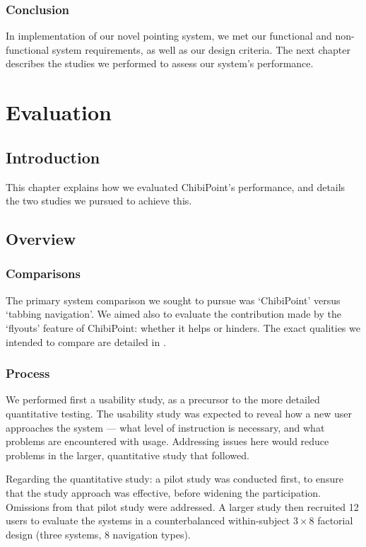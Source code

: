 \documentclass[11pt,openright,a4paper]{report}
\begin{document}
\subsection{Conclusion}
In implementation of our novel pointing system, we met our functional and non-functional system requirements, as well as our design criteria. The next chapter describes the studies we performed to assess our system's performance.

\chapter{Evaluation}
\label{chap:evaluation}
\section{Introduction}
This chapter explains how we evaluated ChibiPoint's performance, and details the two studies we pursued to achieve this.
\section{Overview}
\subsection{Comparisons}
The primary system comparison we sought to pursue was `ChibiPoint' versus `tabbing navigation'. We aimed also to evaluate the contribution made by the `flyouts' feature of ChibiPoint: whether it helps or hinders. The exact qualities we intended to compare are detailed in .

\subsection{Process}
We performed first a usability study, as a precursor to the more detailed quantitative testing. The usability study was expected to reveal how a new user approaches the system --- what level of instruction is necessary, and what problems are encountered with usage. Addressing issues here would reduce problems in the larger, quantitative study that followed.

Regarding the quantitative study: a pilot study was conducted first, to ensure that the study approach was effective, before widening the participation. Omissions from that pilot study were addressed.
A larger study then recruited 12 users to evaluate the systems in a counterbalanced within-subject $3 \times 8$ factorial design (three systems, 8 navigation types).
\end{document}
